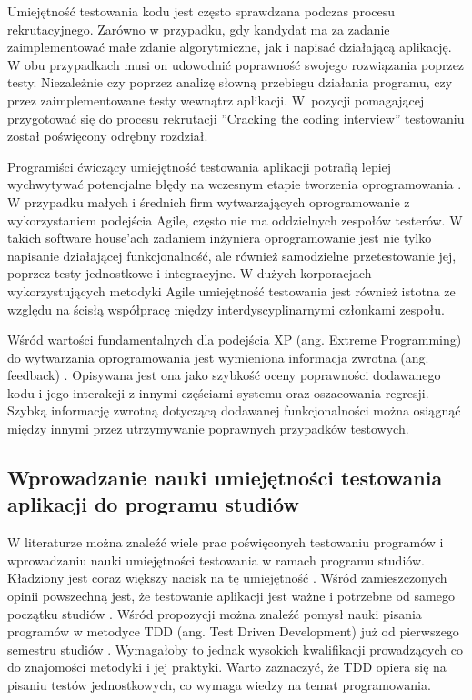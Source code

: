 Umiejętność testowania kodu jest często sprawdzana podczas procesu rekrutacyjnego.
Zarówno w przypadku, gdy kandydat ma za zadanie zaimplementować małe zdanie algorytmiczne, jak i napisać działającą aplikację.
W obu przypadkach musi on udowodnić poprawność swojego rozwiązania poprzez testy.
Niezależnie czy poprzez analizę słowną przebiegu działania programu, czy przez zaimplementowane testy wewnątrz aplikacji.
W~pozycji pomagającej przygotować się do procesu rekrutacji ”Cracking the coding interview” \cite{cracking-the-coding-interview} testowaniu został poświęcony odrębny rozdział.

Programiści ćwiczący umiejętność testowania aplikacji potrafią lepiej wychwytywać potencjalne błędy na wczesnym etapie tworzenia oprogramowania \cite{testing-better-error-catch}.
W przypadku małych i średnich firm wytwarzających oprogramowanie z wykorzystaniem podejścia Agile, często nie ma oddzielnych zespołów testerów.
W takich software house'ach zadaniem inżyniera oprogramowanie jest nie tylko napisanie działającej funkcjonalność, ale również samodzielne przetestowanie jej, poprzez testy jednostkowe i integracyjne.
W dużych korporacjach wykorzystujących metodyki Agile umiejętność testowania jest również istotna ze względu na ścisłą współpracę między interdyscyplinarnymi członkami zespołu.

Wśród wartości fundamentalnych dla podejścia XP (ang. Extreme Programming) do wytwarzania oprogramowania jest wymieniona informacja zwrotna (ang. feedback) \cite{extreem-programming}.
Opisywana jest ona jako szybkość oceny poprawności dodawanego kodu i jego interakcji z innymi częściami systemu oraz oszacowania regresji.
Szybką informację zwrotną dotyczącą dodawanej funkcjonalności można osiągnąć między innymi przez utrzymywanie poprawnych przypadków testowych.

\subsection{Wprowadzanie nauki umiejętności testowania aplikacji do programu studiów}
\label{test_studies}

W literaturze można znaleźć wiele prac poświęconych testowaniu programów i wprowadzaniu nauki umiejętności testowania w ramach programu studiów.
Kładziony jest coraz większy nacisk na tę umiejętność \cite{tests-important}.
Wśród zamieszczonych opinii powszechną jest, że testowanie aplikacji jest ważne i potrzebne od samego początku studiów \cite{test-from-scratch}.
Wśród propozycji można znaleźć pomysł nauki pisania programów w metodyce TDD (ang. Test Driven Development) już od pierwszego semestru studiów \cite{tdd-on-start}.
Wymagałoby to jednak wysokich kwalifikacji prowadzących co do znajomości metodyki i jej praktyki.
Warto zaznaczyć, że TDD opiera się na pisaniu testów jednostkowych, co wymaga wiedzy na temat programowania.

